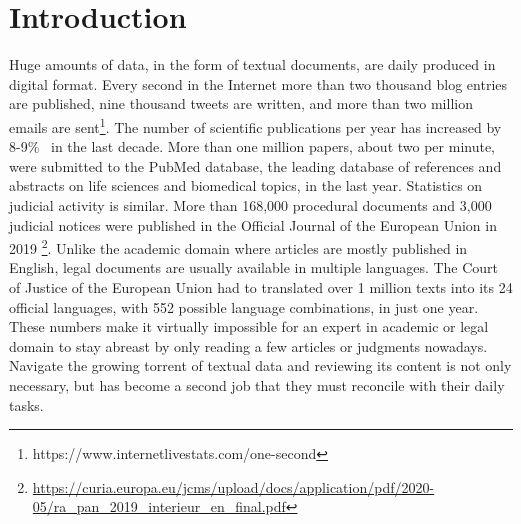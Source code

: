 

\chapter{Introduction}\label{ch:introduction}

\graphicspath{{introduction/figures/}}




Huge amounts of data, in the form of textual documents, are daily produced in digital format. Every second in the Internet more than two thousand blog entries are published, nine thousand tweets are written, and more than two million emails are sent\footnote{https://www.internetlivestats.com/one-second}. The number of scientific publications per year has increased by 8-9\%~ in the last decade\citep{Ware2018STM}. More than one million papers, about two per minute,  were submitted to the PubMed database, the leading database of references and abstracts on life sciences and biomedical topics, in the last year. Statistics on judicial activity is similar. More than 168,000 procedural documents and 3,000 judicial notices were published in the Official Journal of the European Union in 2019 \footnote{\url{https://curia.europa.eu/jcms/upload/docs/application/pdf/2020-05/ra_pan_2019_interieur_en_final.pdf}}. Unlike the academic domain where articles are mostly published in English, legal documents are usually available in multiple languages. The Court of Justice of the European Union had to translated over 1 million texts into its 24 official languages, with 552 possible language combinations, in just one year. These numbers make it virtually impossible for an expert in academic or legal domain to stay abreast by only reading a few articles or judgments nowadays. Navigate the growing torrent of textual data and reviewing its content is not only necessary, but has become a second job that they must reconcile with their daily tasks. 

